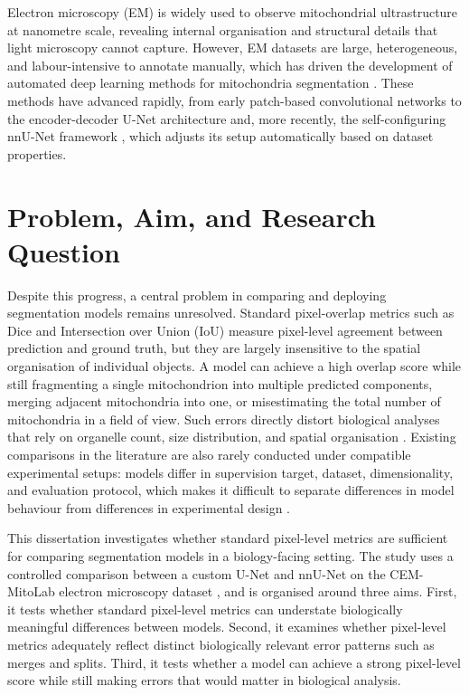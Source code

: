 \documentclass[logo,bsc,singlespacing,parskip,online]{infthesis}
\begin{document}
Electron microscopy (EM) is widely used to observe
mitochondrial ultrastructure at nanometre scale, revealing internal
organisation and structural details that light microscopy cannot capture.
However, EM datasets are large, heterogeneous, and labour-intensive to annotate
manually, which has driven the development of automated deep learning methods
for mitochondria segmentation \citep{aswath2023segmentation}. These methods
have advanced rapidly, from early patch-based convolutional networks to the
encoder-decoder U-Net architecture \citep{ronneberger2015unet} and, more
recently, the self-configuring nnU-Net framework \citep{isensee2021nnu}, which
adjusts its setup automatically based on dataset properties.

\section{Problem, Aim, and Research Question}

Despite this progress, a central problem in comparing and deploying
segmentation models remains unresolved. Standard pixel-overlap metrics such as
Dice and Intersection over Union (IoU) measure pixel-level agreement between
prediction and ground truth,
but they are largely insensitive to the spatial organisation of individual
objects. A model can achieve a high overlap score while still fragmenting a
single mitochondrion into multiple predicted components, merging adjacent
mitochondria into one, or misestimating the total number of
mitochondria in a field of view. Such errors directly distort biological
analyses that rely on organelle count, size distribution, and spatial
organisation \citep{SuomalainenNunnari2024Cell, wei2020mitoem, conrad2023instance}.
Existing comparisons in the literature are also rarely conducted under compatible
experimental setups: models differ in supervision target, dataset, dimensionality,
and evaluation protocol, which makes it difficult to separate differences in model
behaviour from differences in experimental design
\citep{wei2020mitoem, conrad2023instance, xie2025transfer, chen2025gctransnet}.

This dissertation investigates whether standard pixel-level metrics are
sufficient for comparing segmentation models in a biology-facing setting. The
study uses a controlled comparison between a custom U-Net and nnU-Net on the
CEM-MitoLab electron microscopy dataset
\citep{empiar11037}, and is organised around three aims.
First, it tests whether standard pixel-level metrics can understate
biologically meaningful differences between models. Second, it examines
whether pixel-level metrics adequately reflect distinct biologically relevant
error patterns such as merges and splits. Third, it tests whether a model can
achieve a strong pixel-level score while still making errors that would matter
in biological analysis.
\end{document}
